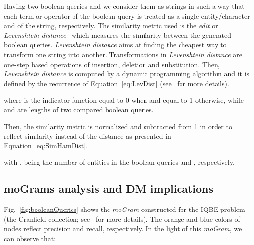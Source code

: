 \documentclass[journal]{IEEEtran}
\begin{document}
Having two boolean queries  and  we consider them as strings in such a way that each term or operator of the boolean query is treated as a single entity/character  and  of the string, respectively. The similarity metric used is the \emph{edit} or \emph{Levenshtein distance}~\cite{levenshtein66} which measures the similarity between the generated boolean queries. \emph{Levenshtein distance} aims at finding the cheapest way to transform one string into another. Transformations in \emph{Levenshtein distance} are one-step based operations of insertion, deletion and substitution.  Then, \emph{Levenshtein distance} is computed by a dynamic programming algorithm and it is defined by the recurrence of Equation~\ref{eq:LevDist} (see~\cite{Navarro01} for more details).






\noindent where  is the indicator function equal to 0 when  and equal to 1 otherwise, while  and  are lengths of two compared boolean queries.

Then, the similarity metric  is normalized and subtracted from 1 in order to reflect similarity instead of the distance as presented in Equation~\ref{eq:SimHamDist}.



\noindent with ,   being the number of entities in the boolean queries  and , respectively.


\subsection{moGrams analysis and DM implications}


Fig.~\ref{fig:booleanQueries} shows the \emph{moGram} constructed for the IQBE problem (the Cranfield collection; see~\cite{Cordon2006} for more details). The orange and blue colors of nodes reflect precision and recall, respectively. In the light of this \emph{moGram}, we can observe that:
\end{document}
